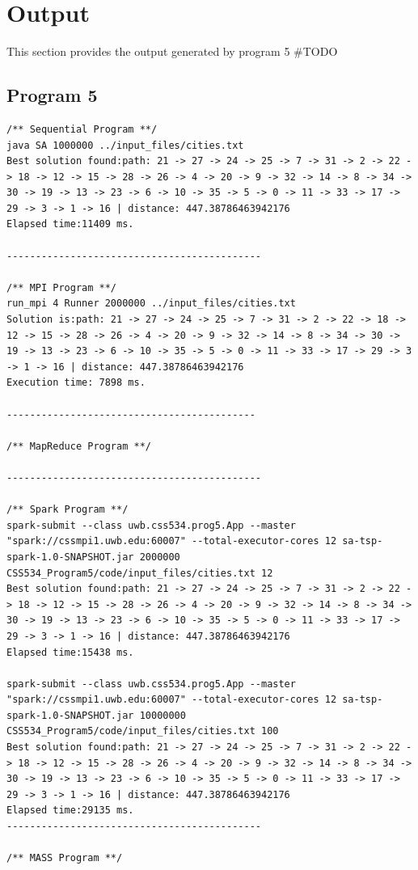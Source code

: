 \documentclass{article}
\begin{document}
	
	\section{Output} \label{OUT}
		This section provides the output generated by program 5 \#TODO\\
		
		\subsection{Program 5} \label{P5_OUT}		
			\begin{lstlisting}
/** Sequential Program **/
java SA 1000000 ../input_files/cities.txt
Best solution found:path: 21 -> 27 -> 24 -> 25 -> 7 -> 31 -> 2 -> 22 -> 18 -> 12 -> 15 -> 28 -> 26 -> 4 -> 20 -> 9 -> 32 -> 14 -> 8 -> 34 -> 30 -> 19 -> 13 -> 23 -> 6 -> 10 -> 35 -> 5 -> 0 -> 11 -> 33 -> 17 -> 29 -> 3 -> 1 -> 16 | distance: 447.38786463942176
Elapsed time:11409 ms.

--------------------------------------------

/** MPI Program **/
run_mpi 4 Runner 2000000 ../input_files/cities.txt
Solution is:path: 21 -> 27 -> 24 -> 25 -> 7 -> 31 -> 2 -> 22 -> 18 -> 12 -> 15 -> 28 -> 26 -> 4 -> 20 -> 9 -> 32 -> 14 -> 8 -> 34 -> 30 -> 19 -> 13 -> 23 -> 6 -> 10 -> 35 -> 5 -> 0 -> 11 -> 33 -> 17 -> 29 -> 3 -> 1 -> 16 | distance: 447.38786463942176
Execution time: 7898 ms.

-------------------------------------------

/** MapReduce Program **/

--------------------------------------------

/** Spark Program **/
spark-submit --class uwb.css534.prog5.App --master "spark://cssmpi1.uwb.edu:60007" --total-executor-cores 12 sa-tsp-spark-1.0-SNAPSHOT.jar 2000000 CSS534_Program5/code/input_files/cities.txt 12
Best solution found:path: 21 -> 27 -> 24 -> 25 -> 7 -> 31 -> 2 -> 22 -> 18 -> 12 -> 15 -> 28 -> 26 -> 4 -> 20 -> 9 -> 32 -> 14 -> 8 -> 34 -> 30 -> 19 -> 13 -> 23 -> 6 -> 10 -> 35 -> 5 -> 0 -> 11 -> 33 -> 17 -> 29 -> 3 -> 1 -> 16 | distance: 447.38786463942176
Elapsed time:15438 ms.

spark-submit --class uwb.css534.prog5.App --master "spark://cssmpi1.uwb.edu:60007" --total-executor-cores 12 sa-tsp-spark-1.0-SNAPSHOT.jar 10000000 CSS534_Program5/code/input_files/cities.txt 100
Best solution found:path: 21 -> 27 -> 24 -> 25 -> 7 -> 31 -> 2 -> 22 -> 18 -> 12 -> 15 -> 28 -> 26 -> 4 -> 20 -> 9 -> 32 -> 14 -> 8 -> 34 -> 30 -> 19 -> 13 -> 23 -> 6 -> 10 -> 35 -> 5 -> 0 -> 11 -> 33 -> 17 -> 29 -> 3 -> 1 -> 16 | distance: 447.38786463942176
Elapsed time:29135 ms.
--------------------------------------------

/** MASS Program **/


			\end{lstlisting}	
	
\end{document}
